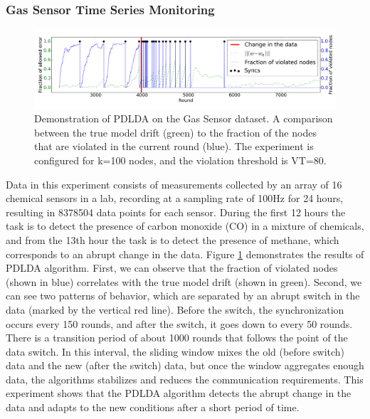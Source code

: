 \subsubsection{Gas Sensor Time Series Monitoring}
\begin{figure}
\centering
\includegraphics[width=\textwidth]{graphics/LDA/overTime100k.png}
\caption{Demonstration of PDLDA on the Gas Sensor dataset.
A comparison between the true model drift (green) to the fraction of the nodes that
are violated in the current round (blue).
The experiment is configured for k=100 nodes, and the violation threshold is
VT=80.}
\label{BigGasOverTime}
\end{figure}
Data in this experiment consists of measurements collected
by an array of 16 chemical sensors in a lab, recording at a sampling
rate of 100Hz for 24 hours, resulting in 8378504 data points for each sensor.
During the first 12 hours the task is to detect the presence of carbon monoxide
(CO) in a mixture of chemicals, and from the 13th hour the task is to detect the presence of methane, 
which corresponds to an abrupt change in the data.
Figure \ref{BigGasOverTime} demonstrates the results of PDLDA algorithm.
First, we can observe that the fraction of violated nodes (shown in blue) correlates with the true model drift (shown in green). Second, we can see two patterns of behavior, which are separated by an abrupt switch in the data  (marked by the vertical red line). Before the switch,  the synchronization occurs every 150 rounds, and after the switch, it goes down to every 50 rounds. There is a transition period of about 1000 rounds that follows the point of the data switch. In this interval, the sliding window mixes the old (before switch) data and the new (after the switch) data, but once the window aggregates enough data, the algorithms stabilizes and reduces the communication requirements.   This experiment shows that the PDLDA algorithm detects the abrupt change in the data and adapts to the new conditions after a short period of time.













